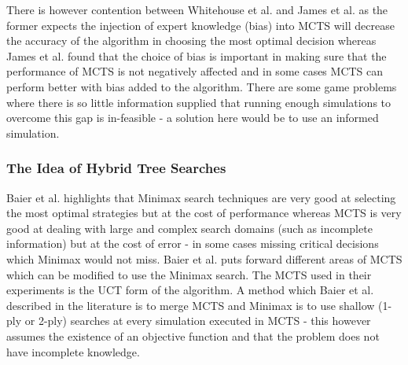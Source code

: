 \documentclass[journal]{IEEEtran}
\begin{document}
  There is however contention between Whitehouse et al. \cite{knowledge} and James et al. \cite{wits} as the former expects the injection of expert knowledge (bias) into MCTS will decrease the accuracy of the algorithm in choosing the most optimal decision whereas James et al. \cite{wits} found that the choice of bias is important in making sure that the performance of MCTS is not negatively affected and in some cases MCTS can perform better with bias added to the algorithm. There are some game problems where there is so little information supplied that running enough simulations to overcome this gap is in-feasible - a solution here would be to use an informed simulation. \\
  
  \subsubsection{The Idea of Hybrid Tree Searches}
  Baier et al. \cite{hybrids} highlights that Minimax search techniques are very good at selecting the most optimal strategies but at the cost of performance whereas MCTS is very good at dealing with large and complex search domains (such as incomplete information) but at the cost of error - in some cases missing critical decisions which Minimax would not miss. Baier et al. \cite{hybrids} puts forward different areas of MCTS which can be modified to use the Minimax search. The MCTS used in their experiments is the UCT form of the algorithm. A method which Baier et al. \cite{hybrids} described in the literature is to merge MCTS and Minimax is to use shallow (1-ply or 2-ply) searches at every simulation executed in MCTS - this however assumes the existence of an objective function and that the problem does not have incomplete knowledge.\\
  
\end{document}

